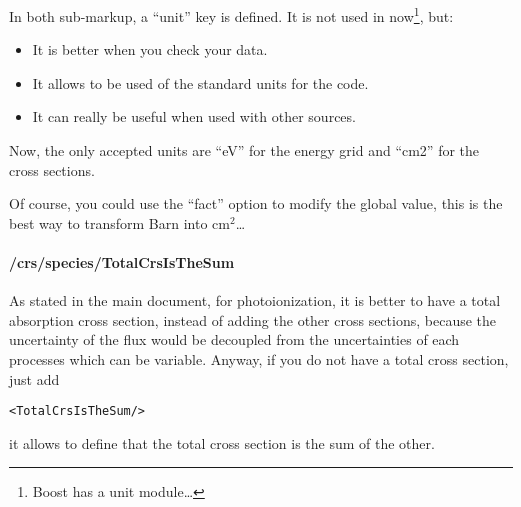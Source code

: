 In both sub-markup, a ``unit'' key is defined. It is not used in \Prog now\footnote{Boost has a unit module\ldots}, but:
\begin{itemize}
	\item It is better when you check your data.
	\item It allows to be used of the standard units for the code.
	\item It can really be useful when used with other sources.
\end{itemize}

Now, the only accepted units are ``eV'' for the energy grid and ``cm2'' for the cross sections.


Of course, you could use the ``fact'' option to modify the  global value, this is the best way to transform Barn into cm$^2$\ldots



\paragraph{/crs/species/TotalCrsIsTheSum}
As stated in the main document, for photoionization, it is better to have a total absorption cross section, instead of adding the other cross sections, because the uncertainty of the flux would be decoupled from the uncertainties of each processes which can be variable.
Anyway, if you do not have a total cross section, just add
\begin{verbatim}
<TotalCrsIsTheSum/>
\end{verbatim}
it allows to define that the total cross section is the sum of the other.



